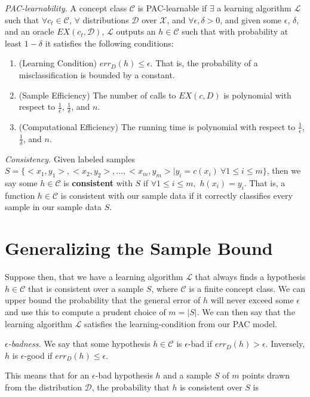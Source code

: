 \documentclass{article}
\newcommand{\ee}{\ensuremath{\epsilon}}
\begin{document}
\emph{PAC-learnability.} A concept class $\mathcal{C}$ is PAC-learnable
if $\exists$ a learning algorithm
$\mathcal{L}$ such that $\forall c_t \in \mathcal{C}$, $\forall$
distributions $\mathcal{D}$ over $\mathcal{X}$, and
$\forall \ee, \delta > 0$, and given some $\ee$, $\delta$, and
an oracle $EX(c_t, \mathcal{D})$, $\mathcal{L}$ outputs an
$h \in \mathcal{C}$ such that with probability at least $1-\delta$ it
satisfies the following conditions:
\begin{enumerate}
    \item (Learning Condition) $err_D(h) \leq
        \ee$. That is, the probability of a misclassification is
        bounded by a constant.
    \item (Sample Efficiency) The number of calls to $EX(c, D)$ is
        polynomial with respect to $\frac{1}{\ee}$,
        $\frac{1}{\delta}$, and $n$.
    \item (Computational Efficiency) The running time is
        polynomial with respect to $\frac{1}{\ee}$,
        $\frac{1}{\delta}$, and $n$.
\end{enumerate}

\emph{Consistency.} Given labeled
samples $S = \{<x_1, y_1>, <x_2, y_2>, ..., <x_m, y_m> | y_i = c(x_i)\
\forall 1 \leq i \leq m\}$, then we say some $h \in \mathcal{C}$ is
\textbf{consistent} with $S$ if $\forall 1 \leq i \leq m,$
$h(x_i) = y_i$. That is, a function $h \in \mathcal{C}$ is consistent
with our sample data if it correctly classifies every sample in our
sample data $S$.

\section{Generalizing the Sample Bound}
Suppose then, that we have a learning algorithm $\mathcal{L}$ that always
finds a hypothesis $h \in \mathcal{C}$ that is consistent over a sample $S$,
where $\mathcal{C}$ is a finite concept class. We can upper bound the
probability that the general error of $h$ will never exceed some $\epsilon$
and use this to compute a prudent choice of $m = |S|$. We can then say that
the learning algorithm $\mathcal{L}$ satisfies the learning-condition from
our PAC model.

\emph{$\epsilon$-badness.} We say that some hypothesis $h \in \mathcal{C}$
is $\epsilon$-bad if $err_D(h) > \epsilon$. Inversely, $h$ is
$\epsilon$-good if $err_D(h) \leq \epsilon$.

This means that for an $\epsilon$-bad hypothesis $h$ and a sample $S$ of
$m$ points drawn from the distribution $\mathcal{D}$, the probability
that $h$ is consistent over $S$ is
\end{document}
